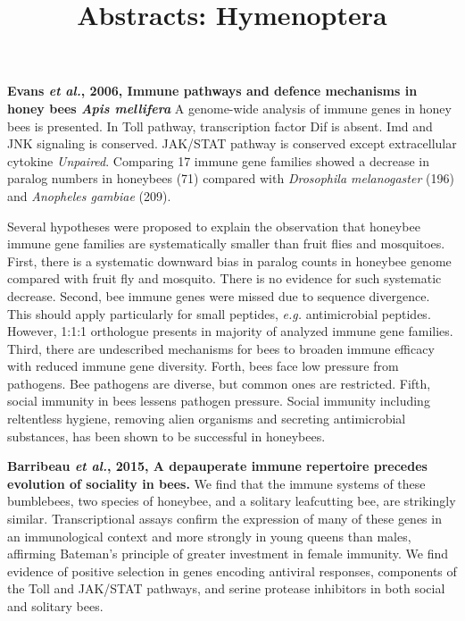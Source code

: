 \documentclass[11pt]{article}
\title{Abstracts: Hymenoptera}
\author{}
\date{}
\begin{document}
\begin{sloppypar}
  \maketitle

  \linenumbers
\textbf{Evans \textit{et al.}, 2006, Immune pathways and defence mechanisms in honey bees \textit{Apis mellifera}} \newline
A genome-wide analysis of immune genes in honey bees is presented. 
In Toll pathway, transcription factor Dif is absent. 
Imd and JNK signaling is conserved. 
JAK/STAT pathway is conserved except extracellular cytokine \textit{Unpaired}. 
Comparing 17 immune gene families showed a decrease in paralog numbers in honeybees (71) compared with \textit{Drosophila melanogaster} (196) and \textit{Anopheles gambiae} (209). 
\par
Several hypotheses were proposed to explain the observation that honeybee immune gene families are systematically smaller than fruit flies and mosquitoes. 
First, there is a systematic downward bias in paralog counts in honeybee genome compared with fruit fly and mosquito. 
There is no evidence for such systematic decrease. 
Second, bee immune genes were missed due to sequence divergence. 
This should apply particularly for small peptides, \textit{e.g.} antimicrobial peptides. 
However, 1:1:1 orthologue presents in majority of analyzed immune gene families. 
Third, there are undescribed mechanisms for bees to broaden immune efficacy with reduced immune gene diversity. 
Forth, bees face low pressure from pathogens. 
Bee pathogens are diverse, but common ones are restricted. 
Fifth, social immunity in bees lessens pathogen pressure. 
Social immunity including reltentless hygiene, removing alien organisms and secreting antimicrobial substances, has been shown to be successful in honeybees. 
\par
\textbf{Barribeau \textit{et al.}, 2015, A depauperate immune repertoire precedes evolution of sociality in bees.} \newline
We find that the immune systems of these bumblebees, two species of honeybee, and a solitary leafcutting bee, are strikingly similar. 
Transcriptional assays confirm the expression of many of these genes in an immunological context and more strongly in young queens than males, affirming Bateman’s principle of greater investment in female immunity. 
We find evidence of positive selection in genes encoding antiviral responses, components of the Toll and JAK/STAT pathways, and serine protease inhibitors in both social and solitary bees. 

\end{sloppypar}
\end{document}
